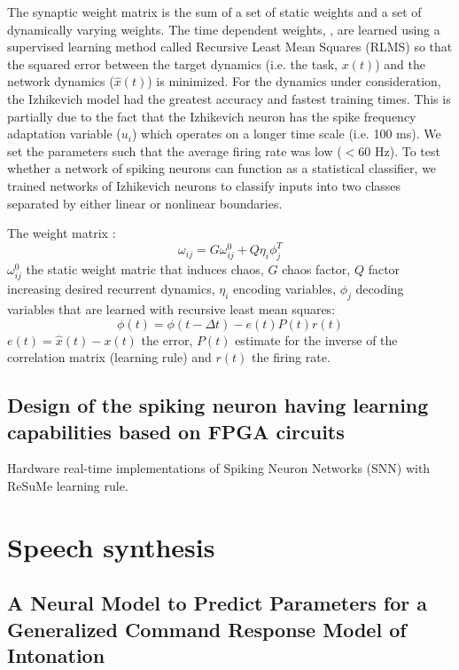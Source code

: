 \documentclass[12pt]{article}
\begin{document}
The synaptic weight matrix is the sum of a set of static weights and a set of dynamically varying weights. The time dependent weights,  , are learned using a supervised learning method called Recursive Least Mean Squares (RLMS) so that the squared error between the target dynamics (i.e. the task, $x(t)$) and the network dynamics ($\hat{x}(t)$) is minimized. For the dynamics under consideration, the Izhikevich model had the greatest accuracy and fastest training times. This is partially due to the fact that the Izhikevich neuron has the spike frequency adaptation variable ($u_i$) which operates on a longer time scale (i.e. 100 ms). We set the parameters such that the average firing rate was low ($< 60$ Hz). To test whether a network of spiking neurons can function as a statistical classifier, we trained networks of Izhikevich neurons to classify inputs into two classes separated by either linear or nonlinear boundaries.

The weight matrix : \begin{equation}
\omega_{ij} = G \omega_{ij}^0 + Q \eta_i \phi_j^T
\end{equation}
$\omega_{ij}^0$ the static weight matric that induces chaos, $G$ chaos factor, $Q$ factor increasing desired recurrent dynamics, $\eta_i$ encoding variables, $\phi_j$ decoding variables that are learned with recursive least mean squares: \begin{equation}
\phi (t) = \phi (t-\Delta t) - e(t) P(t) r(t)
\end{equation}
$e(t) = \hat{x}(t) - x(t)$ the error, $P(t)$ estimate for the inverse of the correlation matrix (learning rule) and $r(t)$ the firing rate.

\subsection{Design of the spiking neuron having learning capabilities based on FPGA circuits \cite{kraft2006design}}
Hardware real-time implementations of Spiking Neuron Networks (SNN) with ReSuMe learning rule.

\section{Speech synthesis}

\subsection{A Neural Model to Predict Parameters for a Generalized Command Response Model of Intonation \cite{schnell2018neural}}
\end{document}
